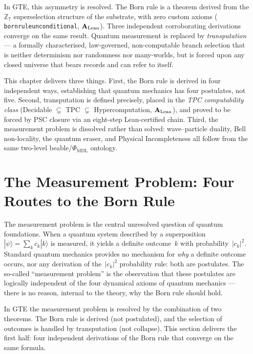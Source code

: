 \documentclass[11pt,openany]{book}
\theoremstyle{remark}
\newcommand{\MDL}{\text{MDL}}
\newcommand{\lean}[1]{%
  \penalty-100
  \begingroup\def\_{\textunderscore\allowbreak}\texttt{#1}\endgroup}
\newcommand{\CatAL}{\ensuremath{\textbf{A}_{\rm Lean}}}
\begin{document}
In GTE, this asymmetry is resolved.  The Born rule is a theorem derived from the
$\mathbb{Z}_7$ superselection structure of the substrate, with zero custom axioms
(\lean{born\_rule\_unconditional}, \CatAL).  Three independent corroborating derivations
converge on the same result.  Quantum measurement is replaced by \emph{transputation}
--- a formally characterised, law-governed, non-computable branch selection that is
neither determinism nor randomness nor many-worlds, but is forced upon any closed
universe that bears records and can refer to itself.

This chapter delivers three things.  First, the Born rule is derived in four independent
ways, establishing that quantum mechanics has four postulates, not five.  Second,
transputation is defined precisely, placed in the \emph{TPC computability class}
(Decidable $\subsetneq$ TPC $\subsetneq$ Hypercomputation, \CatAL), and proved
to be forced by PSC closure via an eight-step Lean-certified chain.  Third, the
measurement problem is dissolved rather than solved: wave--particle duality, Bell
non-locality, the quantum eraser, and Physical Incompleteness all follow from the same
two-level beable/$\Phi_{\MDL}$ ontology.

\section{The Measurement Problem: Four Routes to the Born Rule}
\label{sec:born}

The measurement problem is the central unresolved question of quantum foundations.
When a quantum system described by a superposition
$|\psi\rangle = \sum_k c_k |k\rangle$ is measured, it yields a definite
outcome~$k$ with probability~$|c_k|^2$.  Standard quantum mechanics provides no mechanism
for \emph{why} a definite outcome occurs, nor any derivation of the~$|c_k|^2$ probability
rule: both are postulates.  The so-called ``measurement problem'' is the observation that
these postulates are logically independent of the four dynamical axioms of quantum
mechanics --- there is no reason, internal to the theory, why the Born rule should hold.

In GTE the measurement problem is resolved by the combination of two theorems.
The Born rule is derived (not postulated), and the selection of outcomes is handled by
transputation (not collapse).  This section delivers the first half: four independent
derivations of the Born rule that converge on the same formula.
\end{document}
